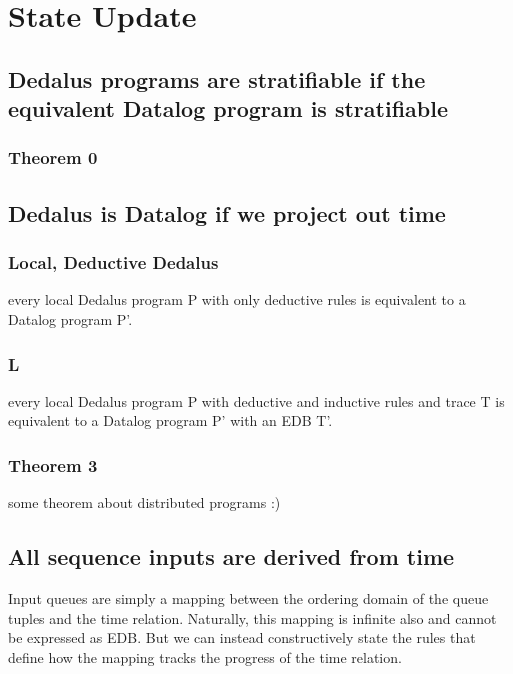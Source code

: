 \section{State Update}

\subsection{Dedalus programs are stratifiable if the equivalent Datalog program is stratifiable}

\subsubsection{Theorem 0}

\subsection{Dedalus is Datalog if we project out time}

\subsubsection{Local, Deductive Dedalus}

every local Dedalus program P with only deductive rules is equivalent to a Datalog program P'.

\subsubsection{L}

every local Dedalus program P with deductive and inductive rules and trace T is equivalent to a Datalog program P' with an EDB T'.

\subsubsection{Theorem 3}

some theorem about distributed programs :)

\subsection{All sequence inputs are derived from time}

Input queues are simply a mapping between the ordering domain of the queue tuples and the time relation.  Naturally, this mapping
is infinite also and cannot be expressed as EDB.  But we can instead constructively state the rules that define how the mapping 
tracks the progress of the time relation.

